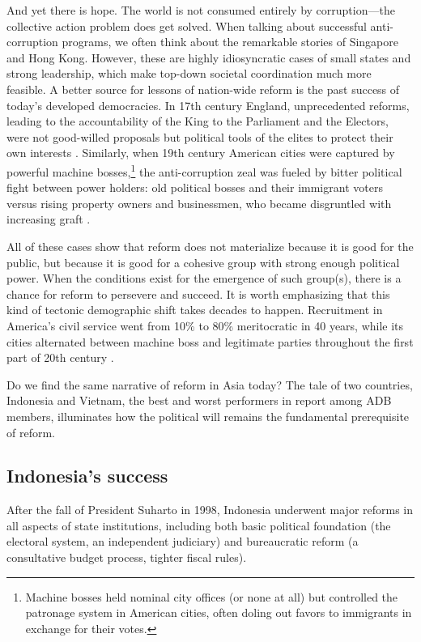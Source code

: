 \documentclass[12pt]{article}
\begin{document}
And yet there is hope. The world is not consumed entirely by corruption---the collective action problem does get solved. When talking about successful anti-corruption programs, we often think about the remarkable stories of Singapore and Hong Kong. However, these are highly idiosyncratic cases of small states and strong leadership, which make top-down societal coordination much more feasible. A better source for lessons of nation-wide reform is the past success of today's developed democracies. In 17th century England, unprecedented reforms, leading to the accountability of the King to the Parliament and the Electors, were not good-willed proposals but political tools of the elites to protect their own interests \citep[5]{Johnston2010a}. Similarly, when 19th century American cities were captured by powerful machine bosses,\footnote{Machine bosses held nominal city offices (or none at all) but controlled the patronage system in American cities, often doling out favors to immigrants in exchange for their votes.} the anti-corruption zeal was fueled by bitter political fight between power holders: old political bosses and their immigrant voters versus rising property owners and businessmen, who became disgruntled with increasing graft \citep[204]{Rose-Ackerman1999}.

All of these cases show that reform does not materialize because it is good for the public, but because it is good for a cohesive group with strong enough political power. When the conditions exist for the emergence of such group(s), there is a chance for reform to persevere and succeed. It is worth emphasizing that this kind of tectonic demographic shift takes decades to happen. Recruitment in America's civil service went from 10\% to 80\% meritocratic in 40 years, while its cities alternated between machine boss and legitimate parties throughout the first part of 20th century \citep{Rose-Ackerman1999}.

Do we find the same narrative of reform in Asia today? The tale of two countries, Indonesia and Vietnam, the best and worst performers in \citet{Integrity2012a} report among ADB members, illuminates how the political will remains the fundamental prerequisite of reform.

\subsection{Indonesia's success} \label{sec:Indonesia}

After the fall of President Suharto in 1998, Indonesia underwent major reforms in all aspects of state institutions, including both basic political foundation (the electoral system, an independent judiciary) and bureaucratic reform (a consultative budget process, tighter fiscal rules).
\end{document}
